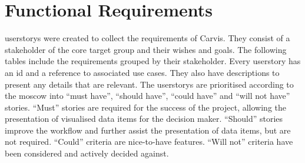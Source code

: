 \chapter{Functional Requirements}

\Glspl{userstory} were created to collect the requirements of Carvis. They consist of a \gls{stakeholder} of the core target group and their wishes and goals. The following tables include the requirements grouped by their \gls{stakeholder}. Every \gls{userstory} has an id and a reference to associated use cases. They also have descriptions to present any details that are relevant. The \glspl{userstory} are prioritised according to the \gls{moscow} into \enquote{must have}, \enquote{should have}, \enquote{could have} and \enquote{will not have} stories. \enquote{Must} stories are required for the success of the project, allowing the presentation of visualised data items for the decision maker. \enquote{Should} stories improve the workflow and further assist the presentation of data items, but are not required. \enquote{Could} criteria are nice-to-have features. \enquote{Will not} criteria have been considered and actively decided against.

